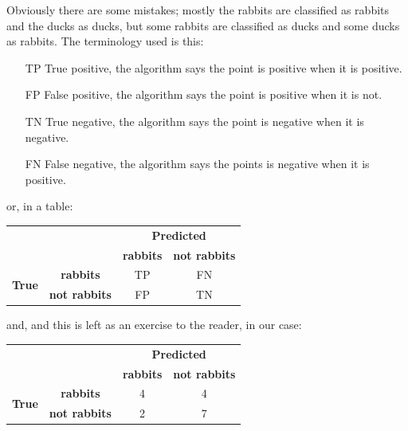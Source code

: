 \documentclass[12pt]{article}
\begin{document}
Obviously there are some mistakes; mostly the rabbits are classified
as rabbits and the ducks as ducks, but some rabbits are classified as
ducks and some ducks as rabbits. The terminology used is this:
\begin{itemize}
\item[TP] True positive, the algorithm says the point is positive when it is positive.
\item[FP] False positive, the algorithm says the point is positive when it is not.
\item[TN] True negative, the algorithm says the point is negative when it is negative.
\item[FN] False negative, the algorithm says the points is negative when it is positive.
\end{itemize}
or, in a table:
\begin{center}
\begin{tabular}{|c|c|c|c|}
\cline{3-4}
\multicolumn{1}{c}{}&\multicolumn{1}{c|}{}&\multicolumn{2}{c|}{\textbf{Predicted}} \\ \cline{3-4} 
\multicolumn{1}{c}{}&\multicolumn{1}{c|}{}& \textbf{rabbits} & \textbf{not rabbits} \\ \hline
\multirow{2}{*}{\textbf{True}}&
\textbf{rabbits} & TP & FN \\ \cline{2-4}
&\textbf{not rabbits} & FP & TN \\ \cline{1-4}
\end{tabular}
  \end{center}
and, and this is left as an exercise to the reader, in our case:
\begin{center}
\begin{tabular}{|c|c|c|c|}
\cline{3-4}
\multicolumn{1}{c}{}&\multicolumn{1}{c|}{}&\multicolumn{2}{c|}{\textbf{Predicted}} \\ \cline{3-4} 
\multicolumn{1}{c}{}&\multicolumn{1}{c|}{}& \textbf{rabbits} & \textbf{not rabbits} \\ \hline
\multirow{2}{*}{\textbf{True}}&
\textbf{rabbits} & 4 & 4 \\ \cline{2-4}
&\textbf{not rabbits} & 2 & 7 \\ \cline{1-4}
\end{tabular}
  \end{center}
\end{document}
